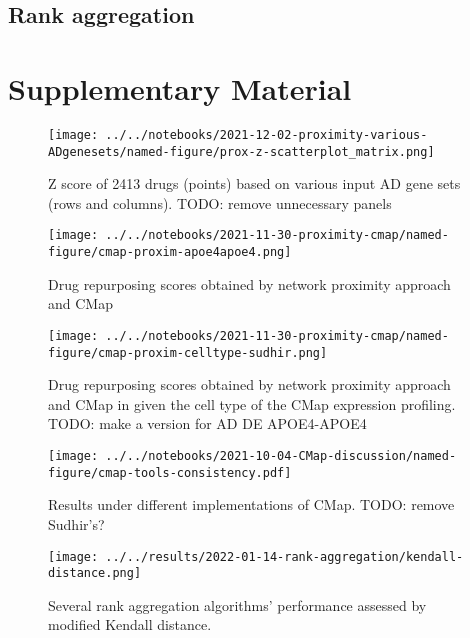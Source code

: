 \documentclass[letterpaper]{article}
\begin{document}
\subsection{Rank aggregation}



\section*{Supplementary Material}

\setcounter{table}{0}
\makeatletter 
\renewcommand{\figurename}{Supplementary Table} %
\makeatother

\setcounter{figure}{0}
\makeatletter 
\renewcommand{\figurename}{Supplementary Figure} %
\makeatother

\begin{figure}[p]
\texttt{[image: ../../notebooks/2021-12-02-proximity-various-ADgenesets/named-figure/prox-z-scatterplot\_matrix.png]}
\caption{
Z score of 2413 drugs (points) based on various input AD gene sets (rows and
columns).
TODO: remove unnecessary panels
}
\label{fig:prox-z-scatterplot-m}
\end{figure}

\begin{figure}[p]
\texttt{[image: ../../notebooks/2021-11-30-proximity-cmap/named-figure/cmap-proxim-apoe4apoe4.png]}
\caption{
Drug repurposing scores obtained by network proximity approach and CMap
}
\label{fig:proxim-cmap}
\end{figure}

\begin{figure}[p]
\texttt{[image: ../../notebooks/2021-11-30-proximity-cmap/named-figure/cmap-proxim-celltype-sudhir.png]}
\caption{
Drug repurposing scores obtained by network proximity approach and CMap in
given the cell type of the CMap expression profiling.
TODO: make a version for AD DE APOE4-APOE4
}
\label{fig:proxim-cmap-celltype}
\end{figure}

\begin{figure}[p]
\texttt{[image: ../../notebooks/2021-10-04-CMap-discussion/named-figure/cmap-tools-consistency.pdf]}
\caption{
Results under different implementations of CMap.
TODO: remove Sudhir's?
}
\label{fig:cmap-cmap}
\end{figure}

\begin{figure}[p]
\texttt{[image: ../../results/2022-01-14-rank-aggregation/kendall-distance.png]}
\caption{
Several rank aggregation algorithms' performance assessed by modified Kendall
distance.
}
\label{fig:rank-diff}
\end{figure}
\end{document}
